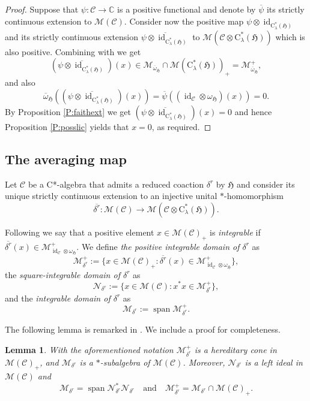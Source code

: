 \documentclass[11pt,final]{amsart}
\numberwithin{equation}{section}
\theoremstyle{plain}
\newtheorem{lemma}[theorem]{Lemma}
\theoremstyle{definition}
\theoremstyle{remark}
\newcommand{\C}{{\mathcal{C}}}
\newcommand{\M}{{\mathcal{M}}}
\newcommand{\N}{{\mathcal{N}}}
\def\de{\delta}
\def\la{\lambda}
\def\om{\omega}
\newcommand{\bC}{\mathbb{C}}
\newcommand{\fH}{{\mathfrak{H}}}
\newcommand{\qand}{\quad\text{and}\quad}
\newcommand{\ca}{\mathrm{C}^*}
\newcommand{\ol}{\overline}
\newcommand{\id}{{\operatorname{id}}}
\newcommand{\spn}{\operatorname{span}}
\begin{document}
\begin{proof}
Suppose that $\psi \colon \C \to \bC$ is a positive functional and denote by $\ol{\psi}$ its strictly continuous extension to $\M(\C)$. Consider now the positive map $\psi \otimes \id_{\ca_\la(\fH)}$ and its strictly continuous extension $\ol{\psi \otimes \id_{\ca_\la(\fH)}}$ to $\M(\C\otimes \ca_\la(\fH))$ which is also positive. Combining with \cite[Proposition 3.9]{KV99} we get  
\[
(\ol{\psi \otimes \id_{\ca_\la(\fH)}}) (x) \in \M_{\ol{\om}_{\fH}} \cap \M(\ca_\la(\fH))_+=\M_{\ol{\om}_{\fH}}^+,
\]
and also 
\[
\ol{\om}_{\fH}((\ol{\psi\otimes \id_{\ca_\la(\fH)}}) (x))=\ol{\psi}((\id_{\C}\otimes \om_{\fH})(x))=0.
\]
By Proposition \ref{P:faithext} we get $(\ol{\psi \otimes \id_{\ca_\la(\fH)}}) (x)=0$ and hence Proposition \ref{P:posslic} yields that $x=0$, as required.
\end{proof}

\subsection{The averaging map}\label{Ss:Aver}

Let $\C$ be a C*-algebra that admits a reduced coaction $\de^r$ by $\fH$ and consider its unique strictly continuous extension to an injective unital $*$-homomorphism 
\[
\ol{\de^r}\colon \M(\C)\to \M(\C\otimes \ca_\la(\fH)).
\]

Following \cite{BM09, Bus10} we say that a positive element $x\in \M(\C)_+$ is \emph{integrable} if $\ol{\de^r}(x)\in \M_{\id_{\C}\otimes \om_{\fH}}^+$. We define \emph{the positive integrable domain of $\de^r$} as
\[
\M_{\de^r}^+:=\{ x\in \M(\C)_+: \ol{\de^r}(x) \in \M_{\id_{\C}\otimes \om_{\fH}}^+\},
\]
the \emph{square-integrable domain of $\de^r$} as
\[
\N_{\de^r}:=\{ x\in \M(\C): x^*x \in \M_{\de^r}^+\},
\]
and the \emph{integrable domain of $\de^r$} as
\[
\M_{\de^r}:= \spn \M_{\de^r}^+.
\]

The following lemma is remarked in \cite[Section~3.2]{BM09}.
We include a proof for completeness.

\begin{lemma}\cite[Section~3.2]{BM09}\label{L:properties}
With the aforementioned notation $\M_{\de^r}^+$ is a hereditary cone in $\M(\C)_+$, and $\M_{\de^r}$ is a $*$-subalgebra of $\M(\C)$. Moreover, $\N_{\de^r}$ is a left ideal in $\M(\C)$ and  
\[
\M_{\de^r}= \spn \N_{\de^r}^*\N_{\de^r} \qand
\M_{\de^r}^+=\M_{\de^r}\cap \M(\C)_+.
\]
\end{lemma}
\end{document}
